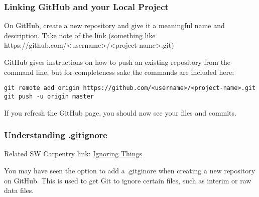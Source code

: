 \subsubsection{Linking GitHub and your Local Project}
On GitHub, create a new repository and give it a meaningful name and description. Take note of the link (something like https://github.com/\textless username\textgreater /\textless project-name\textgreater .git)

GitHub gives instructions on how to push an existing repository from the command line, but for completeness sake the commands are included here:
\begin{verbatim}
git remote add origin https://github.com/<username>/<project-name>.git
git push -u origin master    
\end{verbatim}

If you refresh the GitHub page, you should now see your files and commits.

\subsubsection{Understanding .gitignore}
Related SW Carpentry link: \href{https://swcarpentry.github.io/git-novice/06-ignore/index.html}{Ignoring Things}

You may have seen the option to add a .gitginore when creating a new repository on GitHub. This is used to get Git to ignore certain files, such as interim or raw data files. 